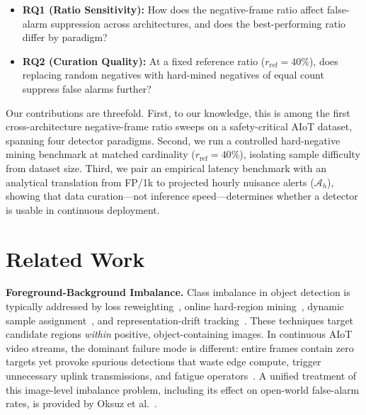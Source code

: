 \documentclass[conference]{IEEEtran}
\begin{document}
\begin{itemize}
\item \textbf{RQ1 (Ratio Sensitivity):} How does the negative-frame
  ratio affect false-alarm suppression across architectures, and does
  the best-performing ratio differ by paradigm?
\item \textbf{RQ2 (Curation Quality):} At a fixed reference ratio
  ($r_{\mathrm{ref}} = 40\%$), does replacing random negatives with
  hard-mined negatives of equal count suppress false alarms further?
\end{itemize}

Our contributions are threefold. First, to our knowledge, this is
among the first cross-architecture negative-frame ratio sweeps on a
safety-critical AIoT dataset, spanning four detector paradigms.
Second, we run a controlled hard-negative mining benchmark at matched
cardinality ($r_{\mathrm{ref}} = 40\%$), isolating sample difficulty
from dataset size. Third, we pair an empirical latency benchmark with
an analytical translation from FP/1k to projected hourly nuisance
alerts ($\mathcal{A}_h$), showing that data curation---not inference
speed---determines whether a detector is usable in continuous
deployment.

\section{Related Work}
\label{sec:related}

\textbf{Foreground-Background Imbalance.}
Class imbalance in object detection is typically addressed by
loss reweighting~\cite{lin2017focal}, online hard-region
mining~\cite{shrivastava2016ohem,singh2018sniper}, dynamic sample
assignment~\cite{zhang2020atss}, and representation-drift
tracking~\cite{wang2019consistent}. These techniques target
candidate regions \textit{within} positive, object-containing
images. In continuous AIoT video streams, the dominant failure mode
is different: entire frames contain zero targets yet provoke
spurious detections that waste edge compute, trigger unnecessary
uplink transmissions, and fatigue operators~\cite{sengupta2023dms,chen2023falsealert}.
A unified treatment of this image-level imbalance problem,
including its effect on open-world false-alarm rates, is provided
by Oksuz et al.~\cite{oksuz2021imbalance}.
\end{document}
